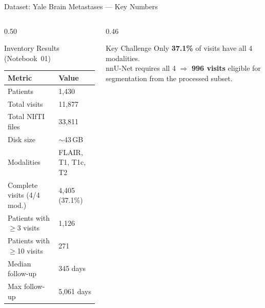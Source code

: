 \documentclass[aspectratio=169, dvipsnames]{beamer}
\begin{document}
\begin{frame}{Dataset: Yale Brain Metastases — Key Numbers}
    \begin{columns}
        \begin{column}{0.50\textwidth}
            \begin{block}{Inventory Results (Notebook~01)}
                \small
                \begin{tabular}{ll}
                    \toprule
                    \textbf{Metric} & \textbf{Value} \\
                    \midrule
                    Patients & 1,430 \\
                    Total visits & 11,877 \\
                    Total NIfTI files & 33,811 \\
                    Disk size & $\sim$43\,GB \\
                    Modalities & FLAIR, T1, T1c, T2 \\
                    \midrule
                    Complete visits (4/4 mod.) & 4,405 (37.1\%) \\
                    Patients with $\geq$3 visits & 1,126 \\
                    Patients with $\geq$10 visits & 271 \\
                    \midrule
                    Median follow-up & 345 days \\
                    Max follow-up & 5,061 days \\
                    \bottomrule
                \end{tabular}
            \end{block}
        \end{column}

        \begin{column}{0.46\textwidth}
            \begin{alertblock}{Key Challenge}
                \small
                Only \textbf{37.1\%} of visits have all 4 modalities.\\[0.3em]
                nnU-Net requires all 4 $\Rightarrow$ \textbf{996 visits} eligible for segmentation from the processed subset.
            \end{alertblock}

            \vspace{0.3em}


\end{column}
\end{columns}
\end{frame}
\end{document}
